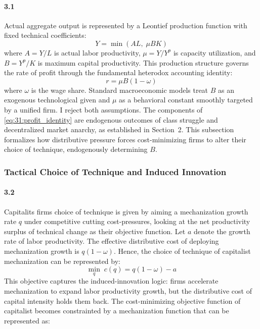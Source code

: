 \paragraph{3.1}
Actual aggregate output is represented by a Leontief
production function with fixed technical coefficients:
\begin{equation}
	Y = \min\left( A L,\; \mu B K \right)
	\label{eq:31:leontief}
\end{equation}
where $A = Y/L$ is actual labor productivity, $\mu = Y/Y^p$
is capacity utilization, and $B = Y^p/K$ is maximum capital
productivity. This production structure governs the rate of
profit through the fundamental heterodox accounting identity:
\begin{equation}
	r = \mu B (1 - \omega)
	\label{eq:31:profit_identity}
\end{equation}
where $\omega$ is the wage share. Standard macroeconomic
models treat $B$ as an exogenous technological given and $\mu$
as a behavioral constant smoothly targeted by a unified firm.
I reject both assumptions. The components of
\eqref{eq:31:profit_identity} are endogenous outcomes of
class struggle and decentralized market anarchy, as
established in Section~2. This subsection formalizes how
distributive pressure forces cost-minimizing firms to alter
their choice of technique, endogenously determining $B$.

\subsubsection{Tactical Choice of Technique and Induced
	Innovation}

\paragraph{3.2}
Capitalits firms choice of technique is given by aiming a mechanization growth rate $q$ under competitive cutting cost-pressures, looking at the net productivity surplus of technical change as their objective function.  Let $a$ denote the growth rate of
labor productivity. The effective distributive cost of
deploying mechanization growth is $q(1-\omega)$. Hence, the choice of technique of capitalist mechanization can be represented by: 
\begin{equation}
	\min_{q}\; c(q) = q(1-\omega) - a 
	\label{eq:31:objective}
\end{equation}
This objective captures the induced-innovation logic: firms
accelerate mechanization to expand labor productivity growth,
but the distributive cost of capital intensity holds them
back. The cost-minimizing objective function of capitalist becomes constrainted by a mechanization function that can be represented as:

